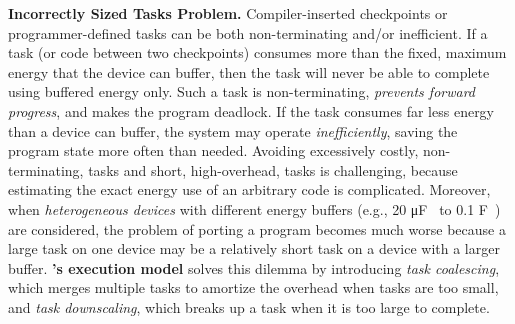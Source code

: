 \textbf{Incorrectly Sized Tasks Problem.} Compiler-inserted checkpoints or
programmer-defined tasks can be both non-terminating and/or
inefficient.  If a task (or code between two checkpoints) consumes more than the fixed,
maximum energy that the device can buffer, then the task
will never be able to complete using buffered energy only.  Such a task is
non-terminating, {\em prevents forward progress}, and makes the program
deadlock. 
%
If the task consumes far less energy than a device can buffer, the system
may operate {\em inefficiently}, saving the program state more often than needed.
%
Avoiding excessively costly, non-terminating, tasks and short, high-overhead,
tasks is challenging, because estimating the exact energy use of an arbitrary code is complicated.  
Moreover, when \emph{heterogeneous devices} with different energy buffers (e.g., 20 \si{\micro\farad}~\cite{rodriguez_tbcs_2015} to 0.1 \si{\farad}~\cite{moo}) are considered, the problem of porting a program becomes much worse
because a large task on one device may be a relatively short task
on a device with a larger buffer.
%
\textbf{\sys's execution model} solves this dilemma by introducing {\em task coalescing}, which
merges multiple tasks to amortize the overhead when tasks are too small, and
{\em task downscaling}, which breaks up a task when it is too large to complete. 
